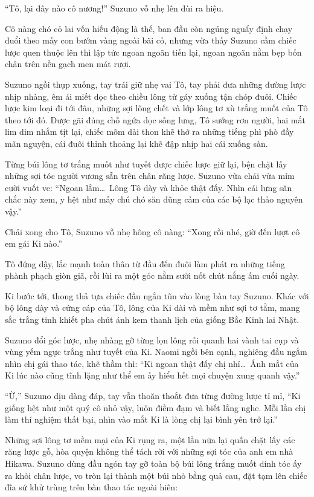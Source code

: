 \documentclass[../main.tex]{subfiles}
\begin{document}
``Tô, lại đây nào cô nương!'' Suzuno vỗ nhẹ lên đùi ra hiệu.

Cô nàng chó cỏ lai vốn hiếu động là thế, ban đầu còn ngúng nguẩy định chạy đuổi theo mấy con bướm vàng ngoài bãi cỏ, nhưng vừa thấy Suzuno cầm chiếc lược quen thuộc lên thì lập tức ngoan ngoãn tiến lại, ngoan ngoãn nằm bẹp bốn chân trên nền gạch men mát rượi.

Suzuno ngồi thụp xuống, tay trái giữ nhẹ vai Tô, tay phải đưa những đường lược nhịp nhàng, êm ái miết dọc theo chiều lông từ gáy xuống tận chóp đuôi. Chiếc lược kim loại đi tới đâu, những sợi lông chết và lớp lông tơ xù trắng muốt của Tô theo tới đó. Được gãi đúng chỗ ngứa dọc sống lưng, Tô sướng rơn người, hai mắt lim dim nhắm tịt lại, chiếc mõm dài thon khẽ thở ra những tiếng phì phò đầy mãn nguyện, cái đuôi thỉnh thoảng lại khẽ đập nhịp hai cái xuống sàn.

Từng búi lông tơ trắng muốt như tuyết được chiếc lược giữ lại, bện chặt lấy những sợi tóc người vương sẵn trên chân răng lược. Suzuno vừa chải vừa mỉm cười vuốt ve: ``Ngoan lắm\dots\ Lông Tô dày và khỏe thật đấy. Nhìn cái lưng săn chắc này xem, y hệt như mấy chú chó săn dũng cảm của các bộ lạc thảo nguyên vậy.''

Chải xong cho Tô, Suzuno vỗ nhẹ hông cô nàng: ``Xong rồi nhé, giờ đến lượt cô em gái Ki nào.''

Tô đứng dậy, lắc mạnh toàn thân từ đầu đến đuôi làm phát ra những tiếng phành phạch giòn giã, rồi lùi ra một góc nằm sưởi nốt chút nắng ấm cuối ngày.

Ki bước tới, thong thả tựa chiếc đầu ngắn tũn vào lòng bàn tay Suzuno. Khác với bộ lông dày và cứng cáp của Tô, lông của Ki dài và mềm như sợi tơ tằm, mang sắc trắng tinh khiết pha chút ánh kem thanh lịch của giống Bắc Kinh lai Nhật.

Suzuno đổi góc lược, nhẹ nhàng gỡ từng lọn lông rối quanh hai vành tai cụp và vùng yếm ngực trắng như tuyết của Ki. Naomi ngồi bên cạnh, nghiêng đầu ngắm nhìn chị gái thao tác, khẽ thầm thì: ``Ki ngoan thật đấy chị nhỉ\dots\ Ánh mắt của Ki lúc nào cũng tĩnh lặng như thể em ấy hiểu hết mọi chuyện xung quanh vậy.''

``Ừ,'' Suzuno dịu dàng đáp, tay vẫn thoăn thoắt đưa từng đường lược tỉ mỉ, ``Ki giống hệt như một quý cô nhỏ vậy, luôn điềm đạm và biết lắng nghe. Mỗi lần chị làm thí nghiệm thất bại, nhìn vào mắt Ki là lòng chị lại bình yên trở lại.''

Những sợi lông tơ mềm mại của Ki rụng ra, một lần nữa lại quấn chặt lấy các răng lược gỗ, hòa quyện không thể tách rời với những sợi tóc của anh em nhà Hikawa. Suzuno dùng đầu ngón tay gỡ toàn bộ búi lông trắng muốt dính tóc ấy ra khỏi chân lược, vo tròn lại thành một búi nhỏ bằng quả cau, đặt tạm lên chiếc đĩa sứ khử trùng trên bàn thao tác ngoài hiên:
\end{document}
